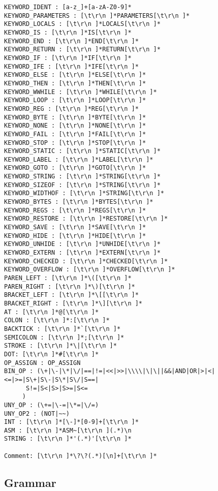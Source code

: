 \begin{verbatim}
KEYWORD_IDENT : [a-z_]+[a-zA-Z0-9]*
KEYWORD_PARAMETERS : [\t\r\n ]*PARAMETERS[\t\r\n ]*
KEYWORD_LOCALS : [\t\r\n ]*LOCALS[\t\r\n ]*
KEYWORD_IS : [\t\r\n ]*IS[\t\r\n ]*
KEYWORD_END : [\t\r\n ]*END[\t\r\n ]*
KEYWORD_RETURN : [\t\r\n ]*RETURN[\t\r\n ]*
KEYWORD_IF : [\t\r\n ]*IF[\t\r\n ]*
KEYWORD_IFE : [\t\r\n ]*IFE[\t\r\n ]*
KEYWORD_ELSE : [\t\r\n ]*ELSE[\t\r\n ]*
KEYWORD_THEN : [\t\r\n ]*THEN[\t\r\n ]*
KEYWORD_WWHILE : [\t\r\n ]*WHILE[\t\r\n ]*
KEYWORD_LOOP : [\t\r\n ]*LOOP[\t\r\n ]*
KEYWORD_REG : [\t\r\n ]*REG[\t\r\n ]*
KEYWORD_BYTE : [\t\r\n ]*BYTE[\t\r\n ]*
KEYWORD_NONE : [\t\r\n ]*NONE[\t\r\n ]*
KEYWORD_FAIL : [\t\r\n ]*FAIL[\t\r\n ]*
KEYWORD_STOP : [\t\r\n ]*STOP[\t\r\n ]*
KEYWORD_STATIC : [\t\r\n ]*STATIC[\t\r\n ]*
KEYWORD_LABEL : [\t\r\n ]*LABEL[\t\r\n ]*
KEYWORD_GOTO : [\t\r\n ]*GOTO[\t\r\n ]*
KEYWORD_STRING : [\t\r\n ]*STRING[\t\r\n ]*
KEYWORD_SIZEOF : [\t\r\n ]*STRING[\t\r\n ]*
KEYWORD_WIDTHOF : [\t\r\n ]*STRING[\t\r\n ]*
KEYWORD_BYTES : [\t\r\n ]*BYTES[\t\r\n ]*
KEYWORD_REGS : [\t\r\n ]*REGS[\t\r\n ]*
KEYWORD_RESTORE : [\t\r\n ]*RESTORE[\t\r\n ]*
KEYWORD_SAVE : [\t\r\n ]*SAVE[\t\r\n ]*
KEYWORD_HIDE : [\t\r\n ]*HIDE[\t\r\n ]*
KEYWORD_UNHIDE : [\t\r\n ]*UNHIDE[\t\r\n ]*
KEYWORD_EXTERN : [\t\r\n ]*EXTERN[\t\r\n ]*
KEYWORD_CHECKED : [\t\r\n ]*CHECKED[\t\r\n ]*
KEYWORD_OVERFLOW : [\t\r\n ]*OVERFLOW[\t\r\n ]*
PAREN_LEFT : [\t\r\n ]*\([\t\r\n ]*
PAREN_RIGHT : [\t\r\n ]*\)[\t\r\n ]*
BRACKET_LEFT : [\t\r\n ]*\[[\t\r\n ]*
BRACKET_RIGHT : [\t\r\n ]*\][\t\r\n ]*
AT : [\t\r\n ]*@[\t\r\n ]*
COLON : [\t\r\n ]*:[\t\r\n ]*
BACKTICK : [\t\r\n ]*`[\t\r\n ]*
SEMICOLON : [\t\r\n ]*;[\t\r\n ]*
STROKE : [\t\r\n ]*\|[\t\r\n ]*
DOT: [\t\r\n ]*#[\t\r\n ]*
OP_ASSIGN : OP_ASSIGN
BIN_OP : (\+|\-|\*|\/|==|!=|<<|>>|\\\\|\|\||&&|AND|OR|>|<|<=|>=|S\+|S\-|S\*|S\/|S==|
	  S!=|S<|S>|S>=|S<=
	 )
UNY_OP : (\+=|\-=|\*=|\/=)
UNY_OP2 : (NOT|~~)
INT : [\t\r\n ]*[\-]*[0-9]+[\t\r\n ]*
ASM : [\t\r\n ]*ASM~[\t\r\n ](.*)\n
STRING : [\t\r\n ]*'(.*)'[\t\r\n ]* 

Comment: [\t\r\n ]*\?\?(.*)[\n]+[\t\r\n ]*
\end{verbatim}

\subsection{Grammar}

